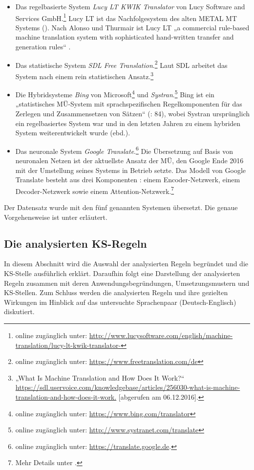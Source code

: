 \begin{itemize}
\item Das regelbasierte System \textit{Lucy LT KWIK Translator} von Lucy Software and Services GmbH.\footnote{online zugänglich unter:
\url{http://www.lucysoftware.com/english/machine-translation/lucy-lt-kwik-translator-}} Lucy LT ist das Nachfolgesystem des alten METAL MT Systems (\citealt{MartinSerra2014}). Nach Alonso und Thurmair ist Lucy LT „a commercial rule-based machine translation system with sophisticated hand-written transfer and generation rules“ \citep{AvramidisEtAl2014}.
\item Das statistische System \textit{SDL Free Translation}.\footnote{online zugänglich unter:
\url{https://www.freetranslation.com/de}} Laut SDL arbeitet das System nach einem rein statistischen Ansatz.\footnote{„What Is Machine Translation and How Does It Work?“ \url{https://sdl.uservoice.com/knowledgebase/articles/256030-what-is-machine-translation-and-how-does-it-work.} [abgerufen am 06.12.2016].}
\item Die Hybridsysteme \textit{Bing} von Microsoft\footnote{online zugänglich unter:
\url{https://www.bing.com/translator}} und \textit{Systran}.\footnote{online zugänglich unter:
\url{http://www.systranet.com/translate}} Bing ist ein „statistisches MÜ-System mit sprachspezifischen Regelkomponenten für das Zerlegen und Zusammensetzen von Sätzen“ (\citealt{WerthmannWitt2014}: 84), wobei Systran ursprünglich ein regelbasiertes System war und in den letzten Jahren zu einem hybriden System weiterentwickelt wurde (ebd.).
\item Das neuronale System \textit{Google Translate}.\footnote{online zugänglich unter: \url{https://translate.google.de}.} Die Übersetzung auf Basis von neuronalen Netzen ist der aktuellste Ansatz der MÜ, den Google Ende 2016 mit der Umstellung seines Systems in Betrieb setzte. Das Modell von Google Translate besteht aus drei Komponenten \citep{WuEtAl2016}: einem Encoder-Netzwerk, einem Decoder-Netzwerk sowie einem Attention-Netzwerk.\footnote{{{{Mehr Details unter .}}}}
\end{itemize}


Der Datensatz wurde mit den fünf genannten Systemen übersetzt. Die genaue Vorgehensweise ist unter  erläutert.

\subsection{Die analysierten KS-Regeln}
\label{sec:4.4.2}
In diesem Abschnitt wird die Auswahl der analysierten Regeln begründet und die KS-Stelle ausführlich erklärt. Daraufhin folgt eine Darstellung der analysierten Regeln zusammen mit deren Anwendungsbegründungen, Umsetzungsmustern und KS-Stellen. Zum Schluss werden die analysierten Regeln und ihre gezielten Wirkungen im Hinblick auf das untersuchte Sprachenpaar (Deutsch-Englisch) diskutiert.

